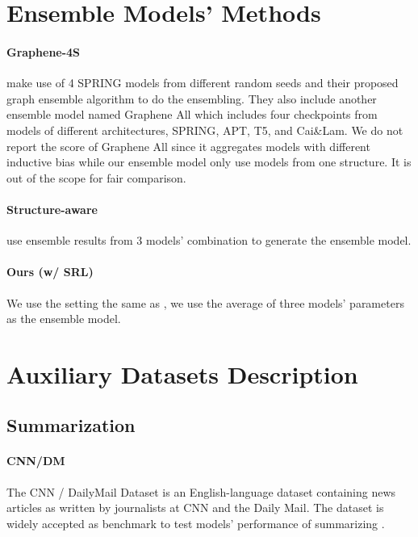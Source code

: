 \documentclass[11pt]{article}
\begin{document}
\section{Ensemble Models' Methods}
\label{app:baselines}

\paragraph{Graphene-4S} \citet{lam2021ensembling} make use of 4 SPRING models from different random seeds and their proposed graph ensemble algorithm to do the ensembling. They also include another ensemble model named Graphene All which includes four checkpoints from models of different architectures, SPRING\citep{bevil-spring}, APT\citep{zhou2021amr}, T5, and Cai\&Lam\citep{cai2020amr}. We do not report the score of Graphene All since it aggregates models with different inductive bias while our ensemble model only use models from one structure. It is out of the scope for fair comparison.

\paragraph{Structure-aware} \citet{saft} use ensemble results from 3 models' combination to generate the ensemble model.

\paragraph{Ours (w/ SRL)} We use the setting the same as \citet{saft}, we use the average of three models' parameters as the ensemble model.


\section{Auxiliary Datasets Description}
\label{app:dataset_des}
\subsection{Summarization}

\paragraph{\textsc{CNN/DM}\citep{Hermann2015TeachingMT}}The CNN / DailyMail Dataset is an English-language dataset containing news articles as written by journalists at CNN and the Daily Mail. The dataset is widely accepted as benchmark to test models' performance of summarizing .
\end{document}

